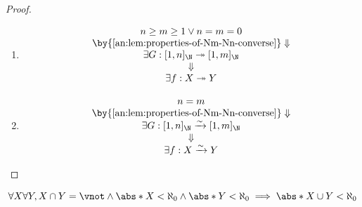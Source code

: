 \begin{proof}
\begin{itemize}
\begin{enumerate}[label=\textbf{(\Alph*)}]
\[\begin{array}{c}
                      \Downarrow                                                 \\
                      \exists f: X \hookrightarrow Y
                    \end{array}
                  \]
            \item
                  \[
                    \begin{array}{c}
                      n \geq m \geq 1 \lor n = m = 0                             \\
                      \by{\Cref{an:lem:properties-of-Nm-Nn-converse}} \Downarrow \\
                      \exists G: [1, n]_{\N} \twoheadrightarrow [1, m]_{\N}      \\
                      \Downarrow                                                 \\
                      \exists f: X \twoheadrightarrow Y
                    \end{array}
                  \]
            \item
                  \[
                    \begin{array}{c}
                      n = m                                                      \\
                      \by{\Cref{an:lem:properties-of-Nm-Nn-converse}} \Downarrow \\
                      \exists G: [1, n]_{\N} \xrightarrow{\sim} [1, m]_{\N}      \\
                      \Downarrow                                                 \\
                      \exists f: X \xrightarrow{\sim} Y
                    \end{array}
                  \]
          \end{enumerate}
  \end{itemize}
\end{proof}

\bigskip

\begin{lemma} \label{an:lem:union-of-two-disjoint-finite-sets-is-finite}
  \[
    \forall X \forall Y, X \cap Y = \vnot \land \abs*{X} < \aleph_{0} \land \abs*{Y} < \aleph_{0}
    \implies \abs*{X \cup Y} < \aleph_{0}
  \]
\end{lemma}
